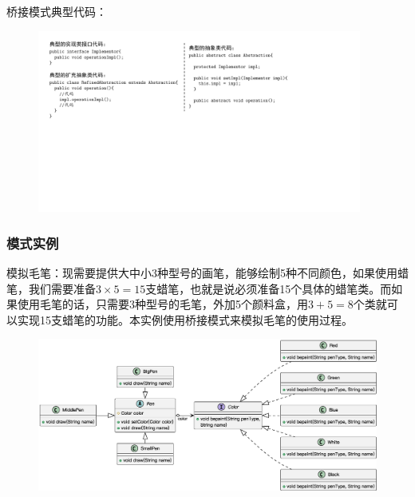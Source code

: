 桥接模式典型代码：
\begin{figure}[H]
    \vspace{-0.5em}
	\centering
	\includegraphics[width=0.95\textwidth]{images/桥接模式典型代码.pdf}
    \vspace{-1em}
\end{figure}

\subsubsection{模式实例}
模拟毛笔：现需要提供大中小3种型号的画笔，能够绘制5种不同颜色，如果使用蜡笔，我们需要准备$3\times 5=15$支蜡笔，也就是说必须准备15个具体的蜡笔类。而如果使用毛笔的话，只需要3种型号的毛笔，外加5个颜料盒，用$3+5=8$个类就可以实现15支蜡笔的功能。本实例使用桥接模式来模拟毛笔的使用过程。
\begin{figure}[H]
    \vspace{-0.5em}
	\centering
	\includegraphics[width=\textwidth]{images/桥接模式实例1.eps}
    \vspace{-1em}
\end{figure}

